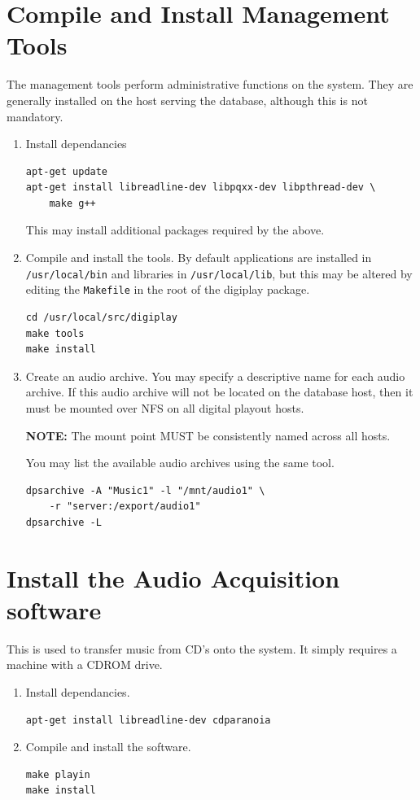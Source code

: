 \documentclass[a4paper,12pt]{report}
\numberwithin{equation}{section}
\begin{document}
\section{Compile and Install Management Tools}
The management tools perform administrative functions on the system. They are generally installed on the host serving the database, although this is not mandatory.
\begin{enumerate}
\item Install dependancies
\begin{lstlisting}
apt-get update
apt-get install libreadline-dev libpqxx-dev libpthread-dev \
	make g++
\end{lstlisting}
This may install additional packages required by the above.
\item Compile and install the tools. By default applications are installed in \texttt{/usr/local/bin} and libraries in \texttt{/usr/local/lib}, but this may be altered by editing the \texttt{Makefile} in the root of the digiplay package.
\begin{lstlisting}
cd /usr/local/src/digiplay
make tools
make install
\end{lstlisting}
\item Create an audio archive. You may specify a descriptive name for each audio archive. If this audio archive will not be located on the database host, then it must be mounted over NFS on all digital playout hosts.\par
\textbf{NOTE:} The mount point MUST be consistently named across all hosts.\par
You may list the available audio archives using the same tool.
\begin{lstlisting}
dpsarchive -A "Music1" -l "/mnt/audio1" \
	-r "server:/export/audio1"
dpsarchive -L
\end{lstlisting}
\end{enumerate}

\section{Install the Audio Acquisition software}
This is used to transfer music from CD's onto the system. It simply requires a machine with a CDROM drive.
\begin{enumerate}
\item Install dependancies.
\begin{lstlisting}
apt-get install libreadline-dev cdparanoia
\end{lstlisting}
\item Compile and install the software.
\begin{lstlisting}
make playin
make install
\end{lstlisting}
\end{enumerate}
\end{document}
